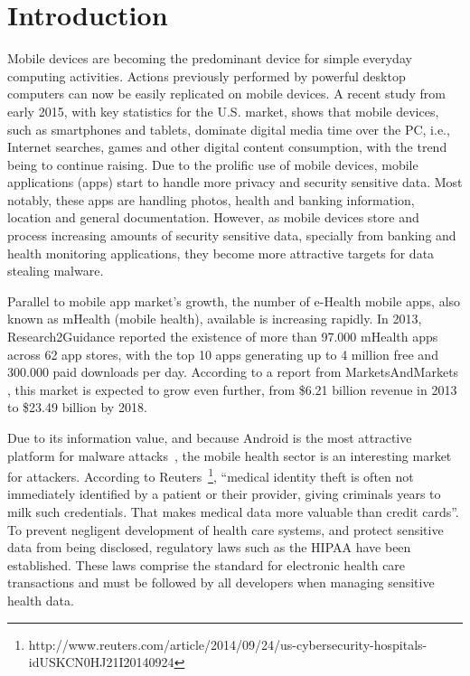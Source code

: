
% 
% 
\section{Introduction}



Mobile devices are becoming the predominant device for simple everyday computing activities. Actions previously performed by powerful desktop computers can now be easily replicated on mobile devices. A recent study \cite{comscore} from early 2015, with key statistics for the U.S. market, shows that mobile devices, such as smartphones and tablets, dominate digital media time over the \ac{PC}, i.e., Internet searches, games and other digital content consumption, with the trend being to continue raising. Due to the prolific use of mobile devices, mobile applications (apps) start to handle more privacy and security sensitive data. Most notably, these apps are handling photos, health and banking information, location and general documentation. However, as mobile devices store and process increasing amounts of security sensitive data, specially from banking and health monitoring applications, they become more attractive targets for data stealing malware.

Parallel to mobile app market's growth, the number of e-Health mobile apps, also known as mHealth (mobile health), available is increasing rapidly. In 2013, Research2Guidance \cite{research2guidance} reported the existence of more than 97.000 mHealth apps across 62 app stores, with the top 10 apps generating up to 4 million free and 300.000 paid downloads per day. According to a report from MarketsAndMarkets \cite{marketsandmarkets}, this market is expected to grow even further, from \$6.21 billion revenue in 2013 to \$23.49 billion by 2018.

Due to its information value, and because Android is the most attractive platform for malware attacks~\cite{fsecure}, the mobile health sector is an interesting market for attackers. According to Reuters~\footnote{http://www.reuters.com/article/2014/09/24/us-cybersecurity-hospitals-idUSKCN0HJ21I20140924}, ``medical identity theft is often not immediately identified by a patient or their provider, giving criminals years to milk such credentials. That makes medical data more valuable than credit cards''. To prevent negligent development of health care systems, and protect sensitive data from being disclosed, regulatory laws such as the \ac{HIPAA} have been established. These laws comprise the standard for electronic health care transactions and must be followed by all developers when managing sensitive health data.

